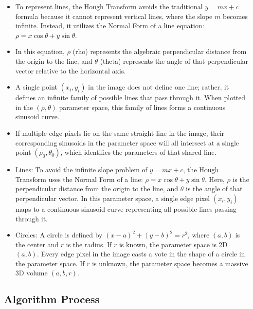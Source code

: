 \documentclass[12pt]{article}
\begin{document}
\begin{itemize}
    \item To represent lines, the Hough Transform avoids the traditional $y = mx + c$ formula because it cannot represent vertical lines, where the slope $m$ becomes infinite. Instead, it utilizes the Normal Form of a line equation: $\rho = x \cos \theta + y \sin \theta$.

    \item In this equation, $\rho$ (rho) represents the algebraic perpendicular distance from the origin to the line, and $\theta$ (theta) represents the angle of that perpendicular vector relative to the horizontal axis.

    \item A single point $(x_i, y_i)$ in the image does not define one line; rather, it defines an infinite family of possible lines that pass through it. When plotted in the $(\rho, \theta)$ parameter space, this family of lines forms a continuous sinusoid curve.

    \item If multiple edge pixels lie on the same straight line in the image, their corresponding sinusoids in the parameter space will all intersect at a single point $(\rho_0, \theta_0)$, which identifies the parameters of that shared line.

    \item Lines: To avoid the infinite slope problem of $y = mx + c$, the Hough Transform uses the Normal Form of a line: $\rho = x \cos \theta + y \sin \theta$. Here, $\rho$ is the perpendicular distance from the origin to the line, and $\theta$ is the angle of that perpendicular vector. In this parameter space, a single edge pixel $(x_i, y_i)$ maps to a continuous sinusoid curve representing all possible lines passing through it.

    \item Circles: A circle is defined by $(x - a)^2 + (y - b)^2 = r^2$, where $(a, b)$ is the center and $r$ is the radius. If $r$ is known, the parameter space is 2D $(a, b)$. Every edge pixel in the image casts a vote in the shape of a circle in the parameter space. If $r$ is unknown, the parameter space becomes a massive 3D volume $(a, b, r)$.
\end{itemize}

\subsection{Algorithm Process}
\end{document}
